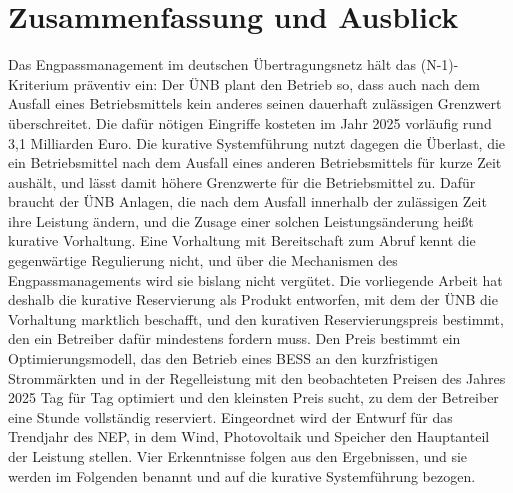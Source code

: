 \chapter{Zusammenfassung und Ausblick}
\label{ch:conc}

Das Engpassmanagement im deutschen Übertragungsnetz hält das (N-1)-Kriterium präventiv ein: Der \ac{ÜNB} plant den Betrieb so, dass auch nach dem Ausfall eines Betriebsmittels kein anderes seinen dauerhaft zulässigen Grenzwert überschreitet.
Die dafür nötigen Eingriffe kosteten im Jahr 2025 vorläufig rund 3,1 Milliarden Euro.
Die kurative Systemführung nutzt dagegen die Überlast, die ein Betriebsmittel nach dem Ausfall eines anderen Betriebsmittels für kurze Zeit aushält, und lässt damit höhere Grenzwerte für die Betriebsmittel zu.
Dafür braucht der \ac{ÜNB} Anlagen, die nach dem Ausfall innerhalb der zulässigen Zeit ihre Leistung ändern, und die Zusage einer solchen Leistungsänderung heißt kurative Vorhaltung.
Eine Vorhaltung mit Bereitschaft zum Abruf kennt die gegenwärtige Regulierung nicht, und über die Mechanismen des Engpassmanagements wird sie bislang nicht vergütet.
Die vorliegende Arbeit hat deshalb die kurative Reservierung als Produkt entworfen, mit dem der \ac{ÜNB} die Vorhaltung marktlich beschafft, und den kurativen Reservierungspreis bestimmt, den ein Betreiber dafür mindestens fordern muss.
Den Preis bestimmt ein Optimierungsmodell, das den Betrieb eines \ac{BESS} an den kurzfristigen Strommärkten und in der Regelleistung mit den beobachteten Preisen des Jahres 2025 Tag für Tag optimiert und den kleinsten Preis sucht, zu dem der Betreiber eine Stunde vollständig reserviert.
Eingeordnet wird der Entwurf für das Trendjahr des \ac{NEP}, in dem Wind, Photovoltaik und Speicher den Hauptanteil der Leistung stellen.
Vier Erkenntnisse folgen aus den Ergebnissen, und sie werden im Folgenden benannt und auf die kurative Systemführung bezogen.

